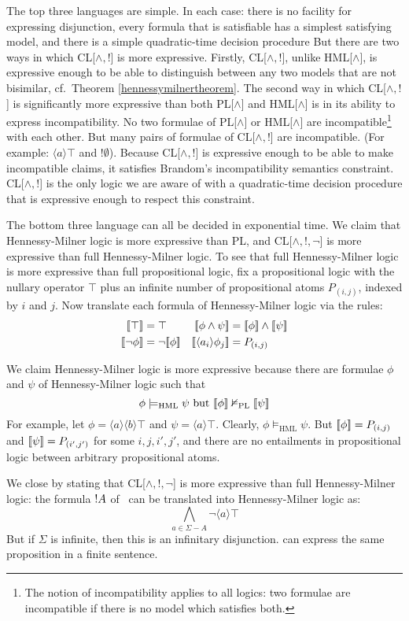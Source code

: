 \NI The top three languages are simple. In each case: there is no
facility for expressing disjunction, every formula that is satisfiable
has a simplest satisfying model, and there is a simple quadratic-time
decision procedure But there are two ways in which CL[$\land, !$] is
more expressive.  Firstly, CL[$\land, !$], unlike HML[$\land$], is expressive enough to be able to distinguish
between any two models that are not bisimilar, cf.~Theorem
\ref{hennessymilnertheorem}.  The second way in which
CL[$\land, !$] is significantly more expressive than both PL[$\land$]
and HML[$\land$] is in its ability to express incompatibility.  No two
formulae of PL[$\land$] or HML[$\land$] are incompatible\footnote{The notion of incompatibility applies to all logics: two formulae are incompatible if there is no model which satisfies both.} with each
other.  But many
pairs of formulae of CL[$\land, !$] are incompatible.  (For example:
$\langle a \rangle \top$ and $! \emptyset$).  Because CL[$\land, !$] is
expressive enough to be able to make incompatible claims, it satisfies
Brandom's incompatibility semantics constraint.
CL[$\land, !$] is the only logic we are aware of with a
quadratic-time decision procedure that is expressive enough to respect
this constraint. 

The bottom three language can all be decided in exponential time.  We
claim that Hennessy-Milner logic is more expressive than PL, and CL[$\land, !, \neg$] is more expressive than full Hennessy-Milner logic.
To see that full Hennessy-Milner logic is more expressive than full
propositional logic, fix a propositional logic with the nullary
operator $\top$ plus an infinite number of propositional atoms
$P_{(i,j)}$, indexed by $i$ and $j$.  Now translate each formula of
Hennessy-Milner logic via the rules:
\begin{align*}
  \SEMB{\top}  & =  \top  &
  \SEMB{\phi \land \psi} & =  \SEMB{\phi} \land \SEMB{\psi}  \\
  \SEMB{\neg \phi} & =  \neg \SEMB{\phi}   &
  \SEMB{\langle a_i \rangle \phi_j} & =  P_{(i,j)} 
\end{align*}

\NI We claim Hennessy-Milner logic is more expressive because there
are formulae $\phi$ and $\psi$ of Hennessy-Milner logic such that
\[
\phi \models_{\text{{HML}}} \psi \mbox{ but } \lbrack\!\lbrack \phi \rbrack\!\rbrack \nvDash_{\text{PL}} \lbrack\!\lbrack \psi \rbrack\!\rbrack
\]
For example, let $\phi = \langle a \rangle \langle b \rangle \top$ and
$\psi = \langle a \rangle \top$.  Clearly, $\phi \models_{\text{HML}}
\psi$. But $\lbrack\!\lbrack \phi \rbrack\!\rbrack = P_{(i,j)}$ and $\lbrack\!\lbrack \psi \rbrack\!\rbrack = P_{(i',j')}$
for some $i,j,i',j'$, and there are no entailments in propositional
logic between arbitrary propositional atoms.

We close by stating that CL[$\land, !, \neg$] is more expressive than
full Hennessy-Milner logic: the formula $! A$ of
\cathoristic\ can be translated into Hennessy-Milner logic as:
\[
\bigwedge_{a \in \Sigma - A} \neg \langle a \rangle \top
\]
But if $\Sigma$ is infinite, then this is an infinitary disjunction.
\Cathoristic{} can express the same proposition in a finite sentence.

